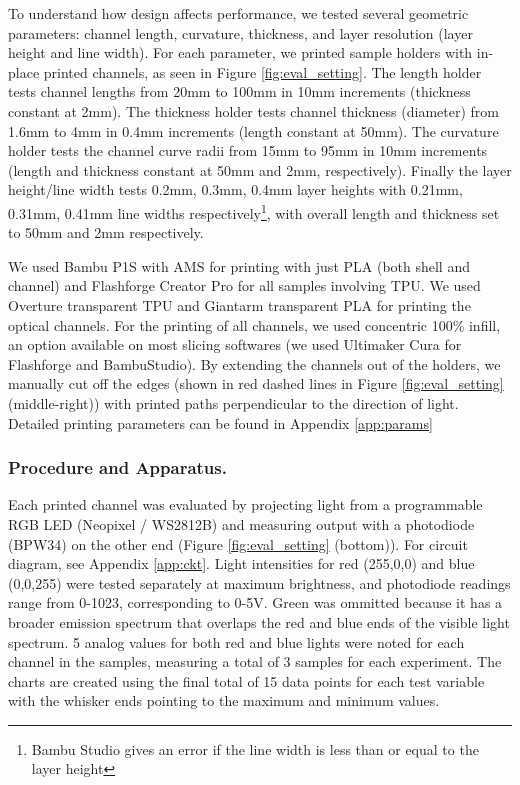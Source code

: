 To understand how design affects performance, we tested several geometric parameters: channel length, curvature, thickness, and layer resolution (layer height and line width). For each parameter, we printed sample holders with in-place printed channels, as seen in Figure \ref{fig:eval_setting}. 
The length holder tests channel lengths from 20mm to 100mm in 10mm increments (thickness constant at 2mm). The thickness holder tests channel thickness (diameter) from 1.6mm to 4mm in 0.4mm increments (length constant at 50mm). The curvature holder tests the channel curve radii from 15mm to 95mm in 10mm increments (length and thickness constant at 50mm and 2mm, respectively). Finally the layer height/line width tests 0.2mm, 0.3mm, 0.4mm layer heights with 0.21mm, 0.31mm, 0.41mm line widths respectively\footnote{Bambu Studio gives an error if the line width is less than or equal to the layer height}, with overall length and thickness set to 50mm and 2mm respectively. 

We used Bambu P1S with AMS for printing with just PLA (both shell and channel) and Flashforge Creator Pro for all samples involving TPU. We used Overture transparent TPU and Giantarm transparent PLA for printing the optical channels. For the printing of all channels, we used concentric 100\% infill, an option available on most slicing softwares (we used Ultimaker Cura for Flashforge and BambuStudio). By extending the channels out of the holders, we manually cut off the edges (shown in red dashed lines in Figure \ref{fig:eval_setting} (middle-right)) with printed paths perpendicular to the direction of light. Detailed printing parameters can be found in Appendix \ref{app:params}

\subsubsection{Procedure and Apparatus.}
Each printed channel was evaluated by projecting light from a programmable RGB LED (Neopixel / WS2812B) and measuring output with a photodiode (BPW34) on the other end (Figure \ref{fig:eval_setting} (bottom)). For circuit diagram, see Appendix \ref{app:ckt}. Light intensities for red (255,0,0) and blue (0,0,255) were tested separately at maximum brightness, and photodiode readings range from 0-1023, corresponding to 0-5V. Green was ommitted because it has a broader emission spectrum that overlaps the red and blue ends of the visible light spectrum. 5 analog values for both red and blue lights were noted for each channel in the samples, measuring a total of 3 samples for each experiment. The  charts are created using the final total of 15 data points for each test variable with the whisker ends pointing to the maximum and minimum values.



